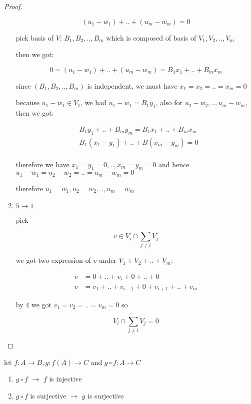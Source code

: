 \begin{proof}
\begin{enumerate}
        \[
            (u_1 - w_1) + .. + (u_m - w_m) = 0
        \]

        pick basis of $V$: $B_1,B_2,..,B_m$ which is composed of basis of $V_1, V_2, .., V_m$

        then we got:

        \[
            0 = (u_1 - w_1) + .. + (u_m - w_m) = B_1x_1 + .. + B_m x_m
        \]

        since $(B_1, B_2,..,B_m)$ is independent, we must have $x_1 = x_2 = .. = x_m = 0$

        because $u_1 - w_1 \in V_1$, we had $u_1- w_1 = B_1y_1$, also for $u_2 - w_2,..,u_m - w_m$, then we got:

        \begin{align*}
            &B_1y_1 + .. + B_my_m = B_1x_1 + .. + B_m x_m \\
            & B_1(x_1 - y_1) + .. + B(x_m - y_m) = 0 \\
        \end{align*}

        therefore we have $x_1 = y_1 = 0, .., x_m = y_m = 0$ and hence $u_1 - w_1 = u_2 - w_2 = .. = u_m - w_m = 0$

        therefore $u_1 = w_1, u_2 = w_2, .. ,u_m = w_m$

        \item $5 \to 1$

        pick 
        
        \[
        v \in V_i \cap \sum_{j \ne i}V_j
        \]

        we got two expression of $v$ under $V_1 + V_2 + .. + V_m$:

        \begin{align*}
            v &= 0+.. + v_i + 0 + .. + 0 \\
            v &= v_1 + .. + v_{i-1} + 0 + v_{i+1} + .. + v_m 
        \end{align*}

        by $4$ we got $v_1 = v_2 = .. = v_m = 0$ so

        \[
V_i \cap \sum_{j \ne i}V_j= 0
        \]


    \end{enumerate}
\end{proof}

\begin{exercise}
    let $f: A \to B, g: f(A) \to C$ and $g \circ f: A \to C$

    \begin{enumerate}
        \item $g \circ f$ $\to$  $f$ is injective
        \item $g \circ f$ is surjective $\to$ $g$ is surjective
    \end{enumerate}
\end{exercise}

